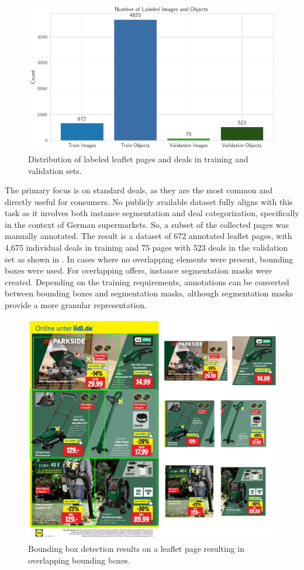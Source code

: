 \documentclass[11pt]{article}
\begin{document}
\begin{figure}[h!]
    \centering
    \includegraphics[width=0.7\linewidth]{figures/deal_detection/dataset_count.png}
    \caption{Distribution of labeled leaflet pages and deals in training and validation sets.}
    \label{fig:ddetect_dataset_count}
\end{figure}

The primary focus is on standard deals, as they are the most common and directly useful for consumers. No publicly available dataset fully aligns with this task as it involves both instance segmentation and deal categorization, specifically in the context of German supermarkets. So, a subset of the collected pages was manually annotated. The result is a dataset of 672 annotated leaflet pages, with 4,675 individual deals in training and 75 pages with 523 deals in the validation set as shown in . In cases where no overlapping elements were present, bounding boxes were used. For overlapping offers, instance segmentation masks were created. Depending on the training requirements, annotations can be converted between bounding boxes and segmentation masks, although segmentation masks provide a more granular representation.


\begin{figure}[h!]
    \centering
    \includegraphics[width=0.6\linewidth]{figures/deal_detection/bbox_page.png}
    \caption{Bounding box detection results on a leaflet page resulting in overlapping bounding boxes.}
    \label{fig:ddetect_bbox_page}
\end{figure}
\end{document}
